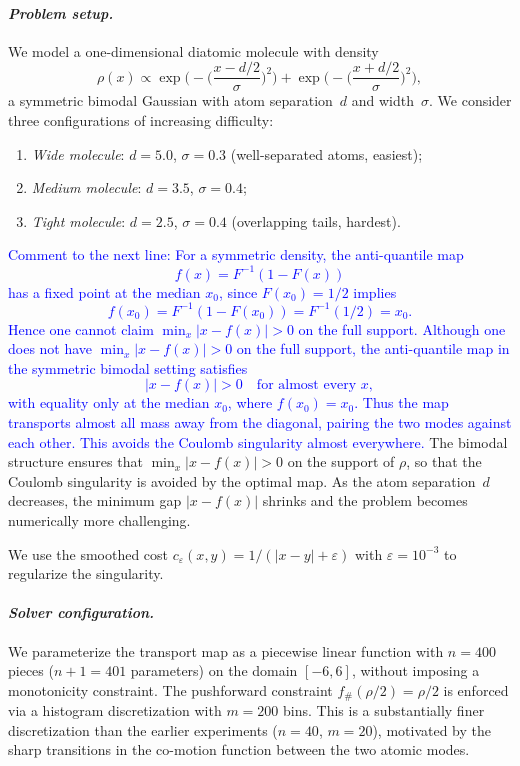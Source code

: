 \documentclass[12pt,leqno]{amsart}
\newcounter{experiment}
\newcommand{\zihe}[1]{\textcolor{blue}{#1}}
\begin{document}
\paragraph{\it Problem setup.}
We model a one-dimensional diatomic molecule with density
\[
    \rho(x) \propto \exp\!\Big(\!-\!\Big(\frac{x - d/2}{\sigma}\Big)^{\!2}\Big) + \exp\!\Big(\!-\!\Big(\frac{x + d/2}{\sigma}\Big)^{\!2}\Big),
\]
a symmetric bimodal Gaussian with atom separation~$d$ and width~$\sigma$. We consider three configurations of increasing difficulty:
\begin{enumerate}
    \item \emph{Wide molecule}: $d = 5.0$, $\sigma = 0.3$ (well-separated atoms, easiest);
    \item \emph{Medium molecule}: $d = 3.5$, $\sigma = 0.4$;
    \item \emph{Tight molecule}: $d = 2.5$, $\sigma = 0.4$ (overlapping tails, hardest).
\end{enumerate}
\zihe{Comment to the next line:
For a symmetric density, the anti-quantile map
\[
f(x)=F^{-1}(1-F(x))
\]
has a fixed point at the median \(x_0\), since \(F(x_0)=1/2\) implies
\[
f(x_0)=F^{-1}(1-F(x_0))=F^{-1}(1/2)=x_0.
\]
Hence one cannot claim \(\min_x |x-f(x)|>0\) on the full support.}
\zihe{Although one does not have \(\min_x |x-f(x)|>0\) on the full support, the anti-quantile map in the symmetric bimodal setting satisfies
\[
|x-f(x)|>0
\quad\text{for almost every }x,
\]
with equality only at the median \(x_0\), where \(f(x_0)=x_0\). Thus the map transports almost all mass away from the diagonal, pairing the two modes against each other. This avoids the Coulomb singularity almost everywhere.}
The bimodal structure ensures that $\min_x |x - f(x)| > 0$ on the support of $\rho$, so that the Coulomb singularity is avoided by the optimal map. As the atom separation~$d$ decreases, the minimum gap $|x - f(x)|$ shrinks and the problem becomes numerically more challenging.

We use the smoothed cost $c_\varepsilon(x,y) = 1/(|x-y| + \varepsilon)$ with $\varepsilon = 10^{-3}$ to regularize the singularity.

\paragraph{\it Solver configuration.}
We parameterize the transport map as a piecewise linear function with $n = 400$ pieces ($n + 1 = 401$ parameters) on the domain $[-6, 6]$, without imposing a monotonicity constraint. The pushforward constraint $f_\#(\rho/2) = \rho/2$ is enforced via a histogram discretization with $m = 200$ bins. This is a substantially finer discretization than the earlier experiments ($n = 40$, $m = 20$), motivated by the sharp transitions in the co-motion function between the two atomic modes.
\end{document}
